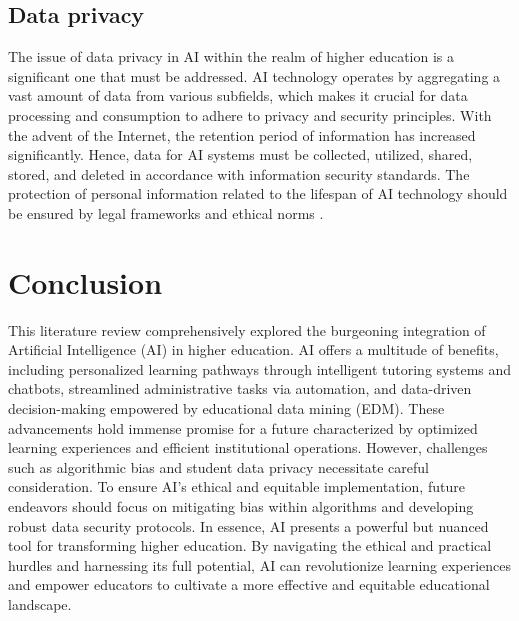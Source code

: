 \subsection{Data privacy}
The issue of data privacy in AI within the realm of higher education is a significant one that must be addressed.
AI technology operates by aggregating a vast amount of data from various subfields, which makes it crucial for data
processing and consumption to adhere to privacy and security principles. With the advent of the Internet, the retention
period of information has increased significantly. Hence, data for AI systems must be collected, utilized, shared, stored,
and deleted in accordance with information security standards. The protection of personal information related to the lifespan
of AI technology should be ensured by legal frameworks and ethical norms \citep{unesco_2022}.

\section{Conclusion}
This literature review comprehensively explored the burgeoning integration of Artificial Intelligence (AI) in higher education.
AI offers a multitude of benefits, including personalized learning pathways through intelligent tutoring systems and chatbots,
streamlined administrative tasks via automation, and data-driven decision-making empowered by educational data mining (EDM).
These advancements hold immense promise for a future characterized by optimized learning experiences and efficient institutional
operations. However, challenges such as algorithmic bias and student data privacy necessitate careful consideration.
To ensure AI's ethical and equitable implementation, future endeavors should focus on mitigating bias within algorithms and developing
robust data security protocols. In essence, AI presents a powerful but nuanced tool for transforming higher education.
By navigating the ethical and practical hurdles and harnessing its full potential, AI can revolutionize learning experiences
and empower educators to cultivate a more effective and equitable educational landscape.
